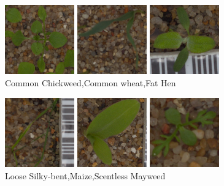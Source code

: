 \begin{center}
\includegraphics[width=30mm,height=30mm]{../figures/Common_Chickweed_0a1c68ef9.png} 	
\includegraphics[width=30mm,height=30mm]{../figures/Common_wheat_6dfb9a152.png} 	
\includegraphics[width=30mm,height=30mm]{../figures/Fat_Hen_0eeb0c7c1.png} 	\\
Common Chickweed,Common wheat,Fat Hen
\end{center}
\begin{center}
\includegraphics[width=30mm,height=30mm]{../figures/Loose_Silky-bent_3cac767c2.png} 	
\includegraphics[width=30mm,height=30mm]{../figures/Maize_1d21b25f9.png}	
\includegraphics[width=30mm,height=30mm]{../figures/Scentless_Mayweed_0ae9acf83.png} 	\\
Loose Silky-bent,Maize,Scentless Mayweed
\end{center}

